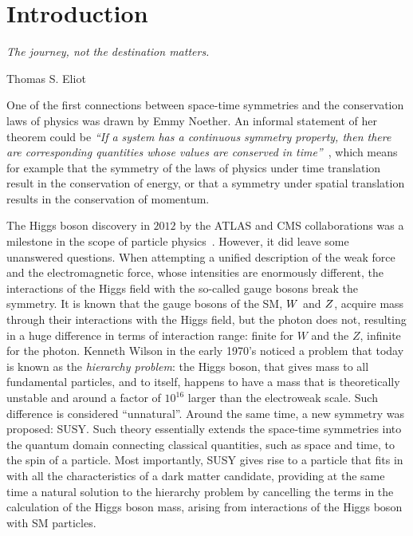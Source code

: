\chapter*{Introduction}
\epigraph{\emph{The journey, not the destination matters.}}{Thomas S. Eliot}


One of the first connections between space-time symmetries and the conservation laws of physics was drawn by Emmy Noether. An informal statement of her theorem could be \emph{``If a system has a continuous symmetry property, then there are corresponding quantities whose values are conserved in time''}~\cite{thompson1994angular}, which means for example that the symmetry of the laws of physics under time translation result in the conservation of energy, or that a symmetry under spatial translation results in the conservation of momentum.

The Higgs boson discovery in $2012$ by the ATLAS and CMS collaborations was a milestone in the scope of particle physics~\cite{ATLASHiggs2012, CMSHiggs2012}. However, it did leave some unanswered questions. When attempting a unified description of the weak force and the electromagnetic force, whose intensities are enormously different, the interactions of the Higgs field with the so-called gauge bosons break the symmetry. It is known that the gauge bosons of the \ac{SM}, $W$ and $Z$, acquire mass through their interactions with the Higgs field, but the photon does not, resulting in a huge difference in terms of interaction range: finite for $W$ and the $Z$, infinite for the photon. Kenneth Wilson in the early 1970’s noticed a problem that today is known as the \emph{hierarchy problem}: the Higgs boson, that gives mass to all fundamental particles, and to itself, happens to have a mass that is theoretically unstable and around a factor of $10^{16}$ larger than the electroweak scale. Such difference is considered ``unnatural''. Around the same time, a new symmetry was proposed: \ac{SUSY}. Such theory essentially extends the space-time symmetries into the quantum domain connecting classical quantities, such as space and time, to the spin of a particle. Most importantly, \ac{SUSY} gives rise to a particle that fits in with all the characteristics of a dark matter candidate, providing at the same time a natural solution to the hierarchy problem by cancelling the terms in the calculation of the Higgs boson mass, arising from interactions of the Higgs boson with \ac{SM} particles.%

